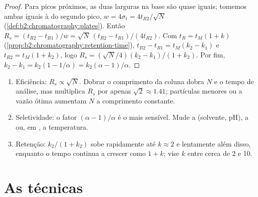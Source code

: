 \begin{proof}
Para picos próximos, as duas larguras na base são quase iguais; tomemos ambas iguais à do segundo pico,
$w = 4\sigma_t = 4t_{R2}/\sqrt N$ (\cref{def:b2:chromatography:plates}). Então $R_s = (t_{R2} -
t_{R1})/w = \sqrt N\,(t_{R2} - t_{R1})/(4t_{R2})$. Com $t_R = t_M(1 + k)$
(\cref{prop:b2:chromatography:retention-time}), $t_{R2} - t_{R1} = t_M(k_2 - k_1)$ e $t_{R2} =
t_M(1 + k_2)$, logo $R_s = (\sqrt N/4)(k_2 - k_1)/(1 + k_2)$. Por fim, $k_2 - k_1 = k_2(1 - 1/\alpha) =
k_2(\alpha - 1)/\alpha$.
\end{proof}

\begin{method}\label{met:b2:chromatography:improve-resolution}
\begin{enumerate}
  \item Eficiência: $R_s \propto \sqrt N$. Dobrar o comprimento da coluna dobra $N$ e o tempo de
        análise, mas multiplica $R_s$ por apenas $\sqrt2 \approx 1.41$; partículas menores ou a vazão
        ótima aumentam $N$ a comprimento constante.
  \item Seletividade: o fator $(\alpha - 1)/\alpha$ é o mais sensível. Mude a 
        (solvente, pH), a  ou, em , a temperatura.
  \item Retenção: $k_2/(1+k_2)$ sobe rapidamente até $k \approx 2$ e lentamente além disso, enquanto o
        tempo continua a crescer como $1 + k$; vise $k$ entre cerca de 2 e 10.
\end{enumerate}
\end{method}

\section{As técnicas}

